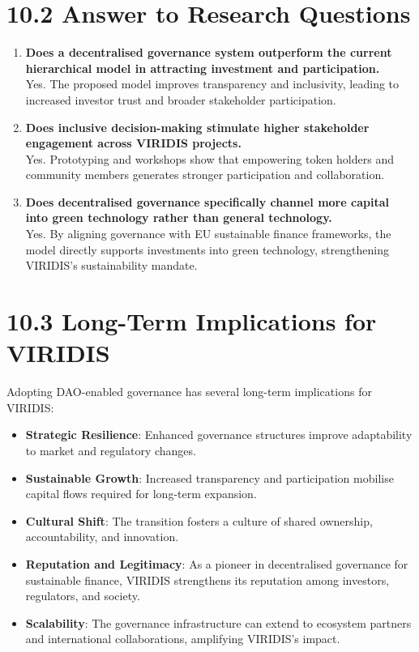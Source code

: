 \documentclass[
  english,
  12pt,
  oneside,
  open=any]{scrbook}
\providecommand{\tightlist}{%
  \setlength{\itemsep}{0pt}\setlength{\parskip}{0pt}}\usepackage{longtable,booktabs,array}
\begin{document}
\section{10.2 Answer to Research Questions}\label{sec-rq-answers}

\begin{enumerate}
\def\labelenumi{\arabic{enumi}.}
\item
  \textbf{Does a decentralised governance system outperform the current
  hierarchical model in attracting investment and participation.}\\
  Yes. The proposed model improves transparency and inclusivity, leading
  to increased investor trust and broader stakeholder participation.
\item
  \textbf{Does inclusive decision-making stimulate higher stakeholder
  engagement across VIRIDIS projects.}\\
  Yes. Prototyping and workshops show that empowering token holders and
  community members generates stronger participation and collaboration.
\item
  \textbf{Does decentralised governance specifically channel more
  capital into green technology rather than general technology.}\\
  Yes. By aligning governance with EU sustainable finance frameworks,
  the model directly supports investments into green technology,
  strengthening VIRIDIS's sustainability mandate.
\end{enumerate}

\section{10.3 Long-Term Implications for
VIRIDIS}\label{long-term-implications-for-viridis}

Adopting DAO-enabled governance has several long-term implications for
VIRIDIS:

\begin{itemize}
\tightlist
\item
  \textbf{Strategic Resilience}: Enhanced governance structures improve
  adaptability to market and regulatory changes.\\
\item
  \textbf{Sustainable Growth}: Increased transparency and participation
  mobilise capital flows required for long-term expansion.\\
\item
  \textbf{Cultural Shift}: The transition fosters a culture of shared
  ownership, accountability, and innovation.\\
\item
  \textbf{Reputation and Legitimacy}: As a pioneer in decentralised
  governance for sustainable finance, VIRIDIS strengthens its reputation
  among investors, regulators, and society.\\
\item
  \textbf{Scalability}: The governance infrastructure can extend to
  ecosystem partners and international collaborations, amplifying
  VIRIDIS's impact.
\end{itemize}
\end{document}

